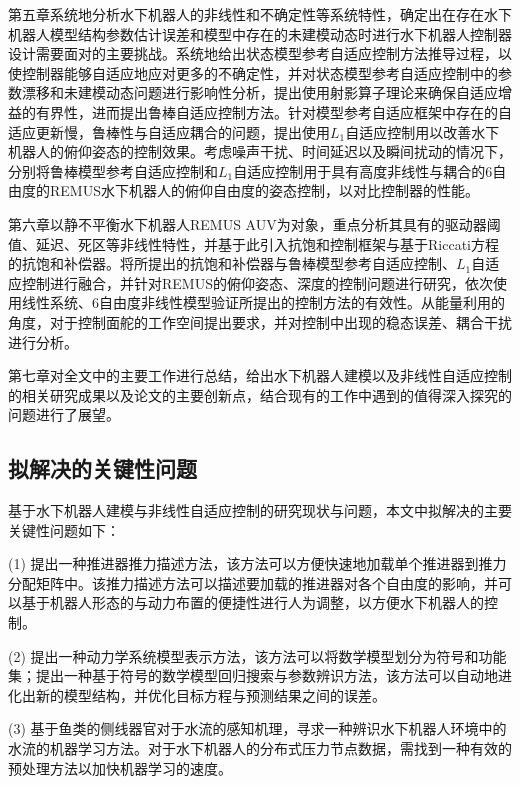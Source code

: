 第五章系统地分析水下机器人的非线性和不确定性等系统特性，确定出在存在水下机器人模型结构参数估计误差和模型中存在的未建模动态时进行水下机器人控制器设计需要面对的主要挑战。系统地给出状态模型参考自适应控制方法推导过程，以使控制器能够自适应地应对更多的不确定性，并对状态模型参考自适应控制中的参数漂移和未建模动态问题进行影响性分析，提出使用射影算子理论来确保自适应增益的有界性，进而提出鲁棒自适应控制方法。针对模型参考自适应框架中存在的自适应更新慢，鲁棒性与自适应耦合的问题，提出使用$L_{1}$自适应控制用以改善水下机器人的俯仰姿态的控制效果。考虑噪声干扰、时间延迟以及瞬间扰动的情况下，分别将鲁棒模型参考自适应控制和$L_{1}$自适应控制用于具有高度非线性与耦合的6自由度的REMUS水下机器人的俯仰自由度的姿态控制，以对比控制器的性能。


第六章以静不平衡水下机器人REMUS AUV为对象，重点分析其具有的驱动器阈值、延迟、死区等非线性特性，并基于此引入抗饱和控制框架与基于Riccati方程的抗饱和补偿器。将所提出的抗饱和补偿器与鲁棒模型参考自适应控制、$L_{1}$自适应控制进行融合，并针对REMUS的俯仰姿态、深度的控制问题进行研究，依次使用线性系统、6自由度非线性模型验证所提出的控制方法的有效性。从能量利用的角度，对于控制面舵的工作空间提出要求，并对控制中出现的稳态误差、耦合干扰进行分析。


第七章对全文中的主要工作进行总结，给出水下机器人建模以及非线性自适应控制的相关研究成果以及论文的主要创新点，结合现有的工作中遇到的值得深入探究的问题进行了展望。


\subsection{拟解决的关键性问题 }

基于水下机器人建模与非线性自适应控制的研究现状与问题，本文中拟解决的主要关键性问题如下：

(1) 提出一种推进器推力描述方法，该方法可以方便快速地加载单个推进器到推力分配矩阵中。该推力描述方法可以描述要加载的推进器对各个自由度的影响，并可以基于机器人形态的与动力布置的便捷性进行人为调整，以方便水下机器人的控制。

(2) 提出一种动力学系统模型表示方法，该方法可以将数学模型划分为符号和功能集；提出一种基于符号的数学模型回归搜索与参数辨识方法，该方法可以自动地进化出新的模型结构，并优化目标方程与预测结果之间的误差。


(3) 基于鱼类的侧线器官对于水流的感知机理，寻求一种辨识水下机器人环境中的水流的机器学习方法。对于水下机器人的分布式压力节点数据，需找到一种有效的预处理方法以加快机器学习的速度。

